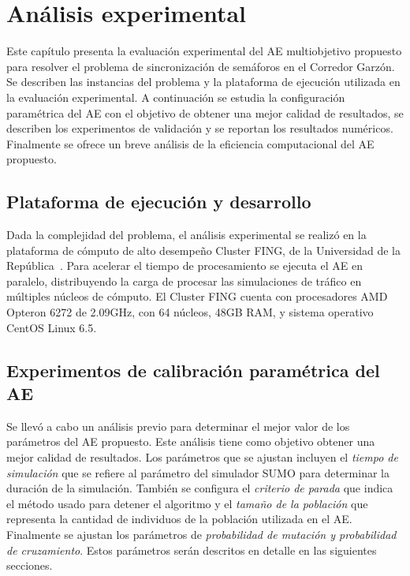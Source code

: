 \chapter{Análisis experimental}
Este capítulo presenta la evaluación experimental del AE multiobjetivo propuesto para resolver el problema de sincronización de semáforos en el Corredor Garzón. Se describen las instancias del problema y la plataforma de ejecución utilizada en la evaluación experimental. A continuación se estudia la configuración paramétrica del AE con el objetivo de obtener una mejor calidad de resultados, se describen los experimentos de validación y se reportan los resultados numéricos. Finalmente se ofrece un breve análisis de la eficiencia computacional del AE propuesto.

\section{Plataforma de ejecución y desarrollo}

Dada la complejidad del problema, el análisis experimental se realizó en la plataforma de cómputo de alto desempeño Cluster FING, de la Universidad de la República~\cite{nesmachnow2010computacion}. Para acelerar el tiempo de procesamiento se ejecuta el AE en paralelo, distribuyendo la carga de procesar las simulaciones de tráfico en múltiples núcleos de cómputo. El Cluster FING cuenta con procesadores AMD Opteron 6272 de 2.09GHz, con 64 núcleos, 48GB RAM, y sistema operativo CentOS Linux 6.5.



\section{Experimentos de calibración paramétrica del AE}
Se llevó a cabo un análisis previo para determinar el mejor valor de los parámetros del AE propuesto. Este análisis tiene como objetivo obtener una mejor calidad de resultados. Los parámetros que se ajustan incluyen el \emph{tiempo de simulación} que se refiere al parámetro del simulador SUMO para determinar la duración de la simulación. También se configura el \emph{criterio de parada} que indica el método usado para detener el algoritmo y el \emph{tamaño de la población} que representa la cantidad de individuos de la población utilizada en el AE. Finalmente se ajustan los parámetros de \emph{probabilidad de mutación y probabilidad de cruzamiento}. Estos parámetros serán descritos en detalle en las siguientes secciones.

